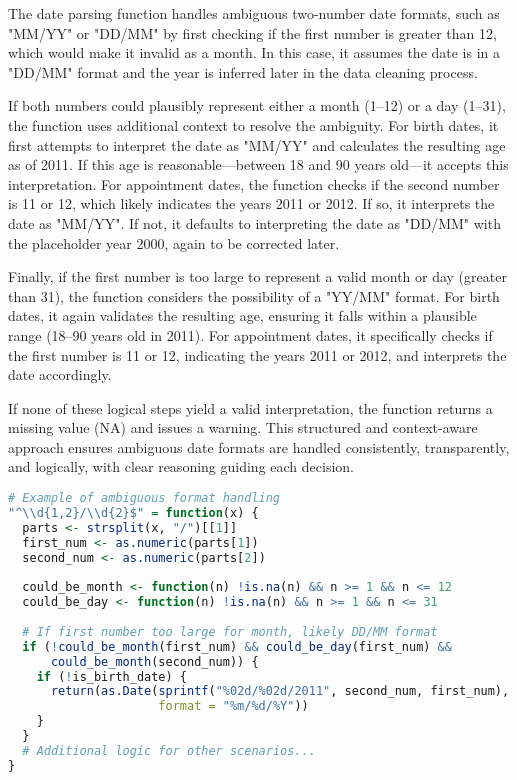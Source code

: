 \documentclass{article}
\begin{document}
The date parsing function handles ambiguous two-number date formats, such as "MM/YY" or "DD/MM" by first checking if the first number is greater than 12, which would make it invalid as a month. In this case, it assumes the date is in a "DD/MM" format and the year is inferred later in the data cleaning process.

If both numbers could plausibly represent either a month (1–12) or a day (1–31), the function uses additional context to resolve the ambiguity. For birth dates, it first attempts to interpret the date as "MM/YY" and calculates the resulting age as of 2011. If this age is reasonable—between 18 and 90 years old—it accepts this interpretation. For appointment dates, the function checks if the second number is 11 or 12, which likely indicates the years 2011 or 2012. If so, it interprets the date as "MM/YY". If not, it defaults to interpreting the date as "DD/MM" with the placeholder year 2000, again to be corrected later.

Finally, if the first number is too large to represent a valid month or day (greater than 31), the function considers the possibility of a "YY/MM" format. For birth dates, it again validates the resulting age, ensuring it falls within a plausible range (18–90 years old in 2011). For appointment dates, it specifically checks if the first number is 11 or 12, indicating the years 2011 or 2012, and interprets the date accordingly.

If none of these logical steps yield a valid interpretation, the function returns a missing value (NA) and issues a warning. This structured and context-aware approach ensures ambiguous date formats are handled consistently, transparently, and logically, with clear reasoning guiding each decision.

\begin{lstlisting}[language=R]
# Example of ambiguous format handling
"^\\d{1,2}/\\d{2}$" = function(x) {
  parts <- strsplit(x, "/")[[1]]
  first_num <- as.numeric(parts[1])
  second_num <- as.numeric(parts[2])
  
  could_be_month <- function(n) !is.na(n) && n >= 1 && n <= 12
  could_be_day <- function(n) !is.na(n) && n >= 1 && n <= 31
  
  # If first number too large for month, likely DD/MM format
  if (!could_be_month(first_num) && could_be_day(first_num) && 
      could_be_month(second_num)) {
    if (!is_birth_date) {
      return(as.Date(sprintf("%02d/%02d/2011", second_num, first_num), 
                     format = "%m/%d/%Y"))
    }
  }
  # Additional logic for other scenarios...
}
\end{lstlisting}
\end{document}
